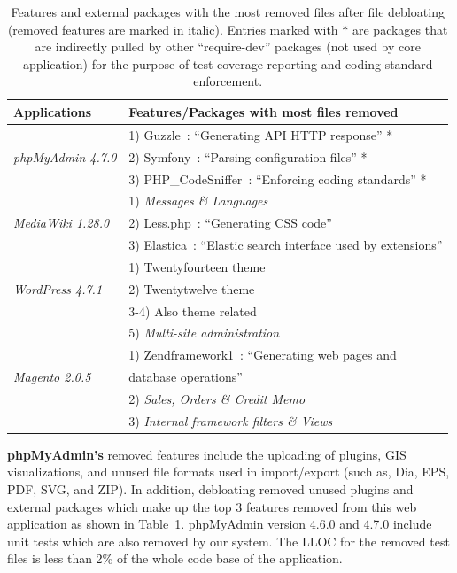 \begin{table}[t]
  \caption{Features and external packages with the most removed files after file debloating (removed features are marked in italic). Entries marked with $\ast$ are packages that are indirectly pulled by other ``require-dev'' packages (not used by core application) for the purpose of test coverage reporting and coding standard enforcement.}
  \label{tab:removed_files_categories}
  \centering
\begin{tabular}{|l|l|}
\hline
\textbf{Applications} & \textbf{Features/Packages with most files removed} \\ \hline
                           & 1) Guzzle~\cite{guzzle}: ``Generating API HTTP response'' *  \\
\textit{phpMyAdmin 4.7.0}  & 2) Symfony~\cite{Symfony}: ``Parsing configuration files'' * \\
                           & 3) PHP\_CodeSniffer~\cite{PHP_CodeSniffer}: ``Enforcing coding standards'' * \\ \hline
                           & 1) \textit{Messages \& Languages} \\
\textit{MediaWiki 1.28.0}  & 2) Less.php~\cite{less.php}: ``Generating CSS code'' \\
		                       & 3) Elastica~\cite{elastica}: ``Elastic search interface used by extensions'' \\ \hline
                           & 1) Twentyfourteen theme~\cite{twentyfourteen_theme} \\
\textit{WordPress 4.7.1}	 & 2) Twentytwelve theme~\cite{twentytwelve_theme} \\
		                       & 3-4) Also theme related \\
		                       & 5) \textit{Multi-site administration} \\ \hline
	                         & 1) Zendframework1~\cite{zendframework1}: ``Generating web pages and\\
\textit{Magento 2.0.5}     & database operations'' \\
		                       & 2) \textit{Sales, Orders \& Credit Memo} \\
		                       & 3) \textit{Internal framework filters \& Views} \\ \hline
\end{tabular}
\end{table}

\vspace{0.5ex}
\noindent\textbf{phpMyAdmin's} removed features include the uploading of plugins, GIS visualizations, and unused file formats used in import/export (such as, Dia, EPS, PDF, SVG, and ZIP). In addition, debloating removed unused plugins and external packages which make up the top 3 features removed from this web application as shown in Table~\ref{tab:removed_files_categories}. phpMyAdmin version 4.6.0 and 4.7.0 include unit tests which are also removed by our system. The LLOC for the removed test files is less than 2\% of the whole code base of the application.

